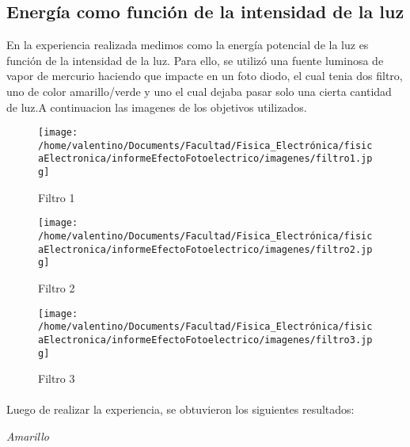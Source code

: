 \documentclass[a4paper]{article}
\begin{document}
      \subsection{Energía como función de la intensidad de la luz}
        \indent En la experiencia realizada medimos como la energía potencial de la luz es función de la intensidad de la luz. Para ello, se utilizó una fuente luminosa de vapor de mercurio haciendo que impacte en un foto diodo, el cual tenia dos filtro, uno de color amarillo/verde y uno el cual dejaba pasar solo una cierta cantidad de luz.A continuacion las imagenes de los objetivos utilizados.
        \vspace{0mm}

        \begin{figure}[h]
                \centering
                \texttt{[image: /home/valentino/Documents/Facultad/Fisica\_Electrónica/fisicaElectronica/informeEfectoFotoelectrico/imagenes/filtro1.jpg]}
                \caption{Filtro 1}
        \end{figure}

        \begin{figure}[h]
                \centering
                \texttt{[image: /home/valentino/Documents/Facultad/Fisica\_Electrónica/fisicaElectronica/informeEfectoFotoelectrico/imagenes/filtro2.jpg]}
                \caption{Filtro 2}
        \end{figure}
          
        \begin{figure}[h]
                \centering
                \texttt{[image: /home/valentino/Documents/Facultad/Fisica\_Electrónica/fisicaElectronica/informeEfectoFotoelectrico/imagenes/filtro3.jpg]}
                \caption{Filtro 3}
        \end{figure}
        
        \paragraph{}
        
        \indent Luego de realizar la experiencia, se obtuvieron los siguientes resultados:
        \vspace{0mm}

        \begin{minipage}[c]{7.5cm}
          \vspace{5mm}
          \centering
          \textit{Amarillo} 
          \vspace{2mm}
        \end{minipage}
\end{document}
